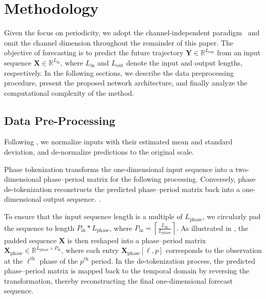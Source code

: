 
\section{Methodology}
\label{sec:method}

Given the focus on periodicity, we adopt the channel-independent paradigm~\citep{nie2023patchtst, zeng2023dlinear} and omit the channel dimension throughout the remainder of this paper. The objective of forecasting is to predict the future trajectory $\mathbf{Y}\in\mathbb{R}^{L_{\text{out}}}$ from an input sequence $\mathbf{X}\in\mathbb{R}^{L_{\text{in}}}$, where $L_{\text{in}}$ and $L_{\text{out}}$ denote the input and output lengths, respectively. In the following sections, we describe the data preprocessing procedure, present the proposed network architecture, and finally analyze the computational complexity of the method.


\subsection{Data Pre-Processing}
\label{subsec:phase-embedding}
Following \cite{kim2021reversible}, we normalize inputs with their estimated mean and standard deviation, and de-normalize predictions to the original scale.

Phase tokenization transforms the one-dimensional input sequence into a two-dimensional phase--period matrix for the following processing. 
Conversely, phase de-tokenization reconstructs the predicted phase--period matrix back into a one-dimensional output sequence. 
. 

To ensure that the input sequence length is a multiple of $L_{\text{phase}}$, we circularly pad the sequence to length $P_{\text{in}}* L_{\text{phase}}$, where $P_{\text{in}} = \left\lceil \frac{L_{\text{in}}}{L_{\text{phase}}} \right\rceil.$ 
As illustrated in , the padded sequence $\mathbf{X}$ is then reshaped into a phase--period matrix $\mathbf{X}_{\text{phase}} \in \mathbb{R}^{L_{\text{phase}} \times P_{\text{in}}}$, where each entry $\mathbf{X}_{\text{phase}}[\ell, p]$ corresponds to the observation at the $\ell^\text{th}$ phase of the $p^\text{th}$ period. 
In the de-tokenization process, the predicted phase–period matrix is mapped back to the temporal domain by reversing the transformation, thereby reconstructing the final one-dimensional forecast sequence.

